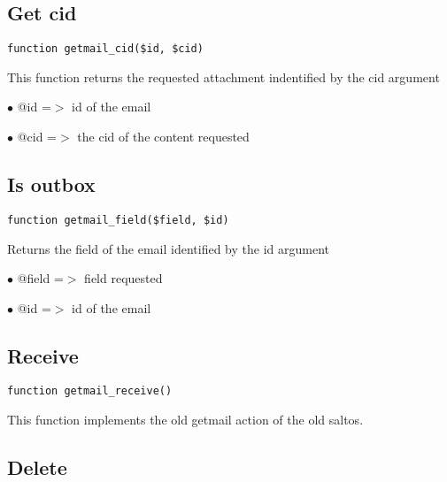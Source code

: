\documentclass[a4paper]{book}
\begin{document}
\hypertarget{toc58}{}
\subsection{Get cid}

\begin{lstlisting}
function getmail_cid($id, $cid)
\end{lstlisting}

This function returns the requested attachment indentified by the cid argument

\begin{compactitem}
\item[\color{myblue}$\bullet$] @id  =$>$ id of the email
\item[\color{myblue}$\bullet$] @cid =$>$ the cid of the content requested
\end{compactitem}

\hypertarget{toc59}{}
\subsection{Is outbox}

\begin{lstlisting}
function getmail_field($field, $id)
\end{lstlisting}

Returns the field of the email identified by the id argument

\begin{compactitem}
\item[\color{myblue}$\bullet$] @field =$>$ field requested
\item[\color{myblue}$\bullet$] @id    =$>$ id of the email
\end{compactitem}

\hypertarget{toc60}{}
\subsection{Receive}

\begin{lstlisting}
function getmail_receive()
\end{lstlisting}

This function implements the old getmail action of the old saltos.

\hypertarget{toc61}{}
\subsection{Delete}
\end{document}

